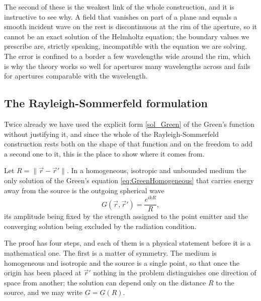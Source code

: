 	The second of these is the weakest link of the whole construction, and it is instructive to see why. A field that vanishes on part of a plane and equals a smooth incident wave on the rest is discontinuous at the rim of the aperture, so it cannot be an exact solution of the Helmholtz equation; the boundary values we prescribe are, strictly speaking, incompatible with the equation we are solving. The error is confined to a border a few wavelengths wide around the rim, which is why the theory works so well for apertures many wavelengths across and fails for apertures comparable with the wavelength.


	\subsection{The Rayleigh-Sommerfeld formulation}

		Twice already we have used the explicit form \eqref{sol_Green} of the Green's function without justifying it, and since the whole of the Rayleigh-Sommerfeld construction rests both on the shape of that function and on the freedom to add a second one to it, this is the place to show where it comes from.

		\begin{myteo}
			Let $R = \|\vec{r}-\vec{r}'\|$. In a homogeneous, isotropic and unbounded medium the only solution of the Green's equation \eqref{eq:GreenHomogeneous} that carries energy away from the source is the outgoing spherical wave
			\begin{equation}\label{eq:GreenSpherical}
				G(\vec{r},\vec{r}') = \frac{e^{ikR}}{R},
			\end{equation}
			its amplitude being fixed by the strength assigned to the point emitter and the converging solution being excluded by the radiation condition.
		\end{myteo}

		The proof has four steps, and each of them is a physical statement before it is a mathematical one. The first is a matter of symmetry. The medium is homogeneous and isotropic and the source is a single point, so that once the origin has been placed at $\vec{r}'$ nothing in the problem distinguishes one direction of space from another; the solution can depend only on the distance $R$ to the source, and we may write $G = G(R)$.


